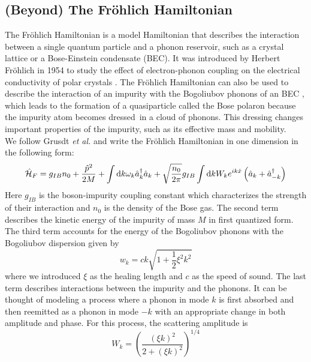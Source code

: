 \subsection{(Beyond) The Fröhlich Hamiltonian}\label{(Beyond) The Fröhlich Hamiltonian}
The Fröhlich Hamiltonian is a model Hamiltonian that describes the interaction between a single quantum particle and a phonon reservoir, such as a crystal lattice or a Bose-Einstein condensate (BEC). It was introduced by Herbert Fröhlich in 1954 to study the effect of electron-phonon coupling on the electrical conductivity of polar crystals \cite{doi:10.1080/00018735400101213}. The Fröhlich Hamiltonian can also be used to describe the interaction of an impurity with the Bogoliubov phonons of an BEC%
, which leads to the formation of a quasiparticle called the Bose polaron because the impurity atom becomes \grqq dressed\grqq\ in a cloud of phonons. This dressing changes important properties of the impurity, such as its effective mass and mobility.\\ 
We follow Grusdt \emph{et al.} \cite{Grusdt_2017} and write the Fröhlich Hamiltonian in one dimension in the following form:
\begin{equation}\label{Fröhlich}
\hat{\mathcal{H}}_F = g_{IB}n_0+\frac{\hat p^2}{2M}+\int\mathrm d k\omega_{ k}\hat a^\dagger_{ k}\hat a_{ k}+\sqrt{\frac{n_0}{2\pi}}g_{IB}\int\mathrm d k W_k e^{ik\hat x}\left(\hat a_{ k}+\hat a^\dagger_{- k}\right)
\end{equation}
Here $g_{IB}$ is the boson-impurity coupling constant which characterizes the strength of their interaction and $n_0$ is the density of the Bose gas. The second term describes the kinetic energy of the impurity of mass $M$ in first quantized form. The third term accounts for the energy of the Bogoliubov phonons with the Bogoliubov dispersion given by 
\begin{equation}\label{bog_disp}
w_k=ck\sqrt{1+\frac12\xi^2k^2}
\end{equation}
where we introduced $\xi$ as the healing length %
and $c$ as the speed of sound.%
The last term describes interactions between the impurity and the phonons. It can be thought of modeling a process where a phonon in mode $k$ is first absorbed and then reemitted as a phonon in mode $-k$ with an appropriate change in both amplitude and phase. For this process, the scattering amplitude is
\begin{equation}\label{W_k_def}
W_k = \left(\frac{(\xi k)^2}{2+(\xi k)^2}\right)^{1/4}
\end{equation}
